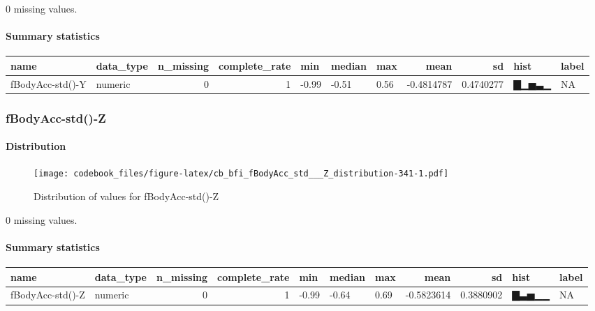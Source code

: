 \documentclass[
]{article}
\begin{document}
0 missing values.

\hypertarget{fBodyAcc_std___Y_summary}{%
\paragraph{Summary statistics}\label{fBodyAcc_std___Y_summary}}

\begin{longtable}[]{@{}llrrlllrrll@{}}
\toprule
name & data\_type & n\_missing & complete\_rate & min & median & max &
mean & sd & hist & label \\
\midrule
\endhead
fBodyAcc-std()-Y & numeric & 0 & 1 & -0.99 & -0.51 & 0.56 & -0.4814787 &
0.4740277 & ▇▁▅▃▁ & NA \\
\bottomrule
\end{longtable}

\hypertarget{fBodyAcc_std___Z}{%
\subsubsection{fBodyAcc-std()-Z}\label{fBodyAcc_std___Z}}

\hypertarget{fBodyAcc_std___Z_distribution}{%
\paragraph{Distribution}\label{fBodyAcc_std___Z_distribution}}

\begin{figure}
\centering
\texttt{[image: codebook\_files/figure-latex/cb\_bfi\_fBodyAcc\_std\_\_\_Z\_distribution-341-1.pdf]}
\caption{Distribution of values for fBodyAcc-std()-Z}
\end{figure}

0 missing values.

\hypertarget{fBodyAcc_std___Z_summary}{%
\paragraph{Summary statistics}\label{fBodyAcc_std___Z_summary}}

\begin{longtable}[]{@{}llrrlllrrll@{}}
\toprule
name & data\_type & n\_missing & complete\_rate & min & median & max &
mean & sd & hist & label \\
\midrule
\endhead
fBodyAcc-std()-Z & numeric & 0 & 1 & -0.99 & -0.64 & 0.69 & -0.5823614 &
0.3880902 & ▇▃▅▁▁ & NA \\
\bottomrule
\end{longtable}
\end{document}

